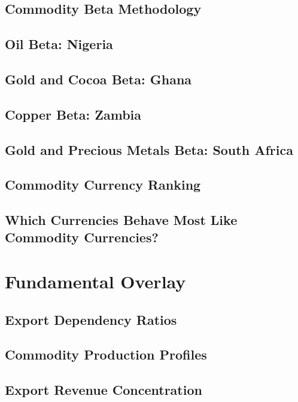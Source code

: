 \documentclass{article}
\begin{document}
\subsection{Commodity Beta Methodology}

\subsection{Oil Beta: Nigeria}

\subsection{Gold and Cocoa Beta: Ghana}

\subsection{Copper Beta: Zambia}

\subsection{Gold and Precious Metals Beta: South Africa}

\subsection{Commodity Currency Ranking}

\subsection{Which Currencies Behave Most Like Commodity Currencies?}

\section{Fundamental Overlay}

\subsection{Export Dependency Ratios}

\subsection{Commodity Production Profiles}

\subsection{Export Revenue Concentration}
\end{document}
